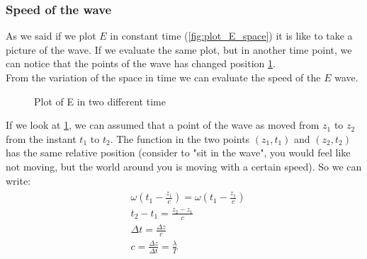 \subsubsection*{Speed of the wave}
As we said if we plot $E$ in constant time (\cref{fig:plot_E_space}) it is like to take a picture of the wave. If we evaluate the same plot, but in another time point, we can notice that the points of the wave has changed position \cref{fig:plot_E_variation}.\\
From the variation of the space in time we can evaluate the speed of the $E$ wave.
\begin{figure}[H]
    \begin{center}
    \end{center}
    \caption{Plot of E in two different time}\label{fig:plot_E_variation}
\end{figure}
If we look at \cref{fig:plot_E_variation}, we can assumed that a point of the wave as moved from $z_1$ to $z_2$ from the instant $t_1$ to $t_2$. The function in the two points $(z_1,t_1)$ and $(z_2,t_2)$ has the same relative position (consider to "sit in the wave", you would feel like not moving, but the world around you is moving with a certain speed). So we can write:
\begin{align}
    \begin{split}
        &\omega\left(t_1-\frac{z_1}{c}\right)=\omega\left(t_1-\frac{z_1}{c}\right)\\[5pt]
        &t_2-t_1=\frac{z_2-z_1}{c}\\[5pt]
        &\Delta t= \frac{\Delta z}{c}\\[5pt]
        &c=\frac{\Delta z}{\Delta t}=\frac{\lambda}{T}
    \end{split}
\end{align}

